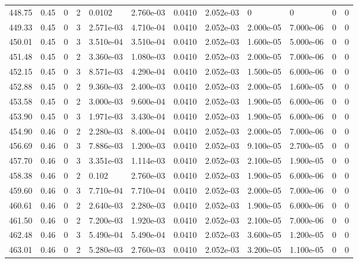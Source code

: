 \documentclass[preview]{standalone}
\begin{document}
{{{{{{{{{{{{{{{\begin{tabular}{L{1.2cm}C{1.2cm} C{0.3cm}C{0.5cm} C{1.4cm}C{1.4cm} C{1.4cm}C{1.4cm} C{1.6cm}C{1.6cm} C{1.6cm}C{1.6cm}}
  448.75  &  0.45  & 0     &  2 &  0.0102  & 2.760e-03  &  0.0410&   2.052e-03& 0 & 0   &  0 & 0  \\ 
  449.33  &  0.45  & 0     &  3 &  2.571e-03  & 4.710e-04  &  0.0410&   2.052e-03& 2.000e-05 & 7.000e-06   &  0 & 0  \\ 
  450.01  &  0.45  & 0     &  3 &  3.510e-04  & 3.510e-04  &  0.0410&   2.052e-03& 1.600e-05 & 5.000e-06   &  0 & 0  \\ 
  451.48  &  0.45  & 0     &  2 &  3.360e-03  & 1.080e-03  &  0.0410&   2.052e-03& 2.000e-05 & 7.000e-06   &  0 & 0  \\ 
  452.15  &  0.45  & 0     &  3 &  8.571e-03  & 4.290e-04  &  0.0410&   2.052e-03& 1.500e-05 & 6.000e-06   &  0 & 0  \\ 
  452.88  &  0.45  & 0     &  2 &  9.360e-03  & 2.400e-03  &  0.0410&   2.052e-03& 2.000e-05 & 1.600e-05   &  0 & 0  \\ 
  453.58  &  0.45  & 0     &  2 &  3.000e-03  & 9.600e-04  &  0.0410&   2.052e-03& 1.900e-05 & 6.000e-06   &  0 & 0  \\ 
  453.90  &  0.45  & 0     &  3 &  1.971e-03  & 3.430e-04  &  0.0410&   2.052e-03& 1.900e-05 & 6.000e-06   &  0 & 0  \\ 
  454.90  &  0.46  & 0     &  2 &  2.280e-03  & 8.400e-04  &  0.0410&   2.052e-03& 2.000e-05 & 7.000e-06   &  0 & 0  \\ 
  456.69  &  0.46  & 0     &  3 &  7.886e-03  & 1.200e-03  &  0.0410&   2.052e-03& 9.100e-05 & 2.700e-05   &  0 & 0  \\ 
  457.70  &  0.46  & 0     &  3 &  3.351e-03  & 1.114e-03  &  0.0410&   2.052e-03& 2.100e-05 & 1.900e-05   &  0 & 0  \\ 
  458.38  &  0.46  & 0     &  2 &  0.102  & 2.760e-03  &  0.0410&   2.052e-03& 1.900e-05 & 6.000e-06   &  0 & 0  \\ 
  459.60  &  0.46  & 0     &  3 &  7.710e-04  & 7.710e-04  &  0.0410&   2.052e-03& 2.000e-05 & 7.000e-06   &  0 & 0  \\ 
  460.61  &  0.46  & 0     &  2 &  2.640e-03  & 2.280e-03  &  0.0410&   2.052e-03& 1.900e-05 & 6.000e-06   &  0 & 0  \\ 
  461.50  &  0.46  & 0     &  2 &  7.200e-03  & 1.920e-03  &  0.0410&   2.052e-03& 2.100e-05 & 7.000e-06   &  0 & 0  \\ 
  462.48  &  0.46  & 0     &  3 &  5.490e-04  & 5.490e-04  &  0.0410&   2.052e-03& 3.600e-05 & 1.200e-05   &  0 & 0  \\ 
  463.01  &  0.46  & 0     &  2 &  5.280e-03  & 2.760e-03  &  0.0410&   2.052e-03& 3.200e-05 & 1.100e-05   &  0 & 0  \\ 

\end{tabular}}}}}}}}}}}}}}}}
\end{document}
